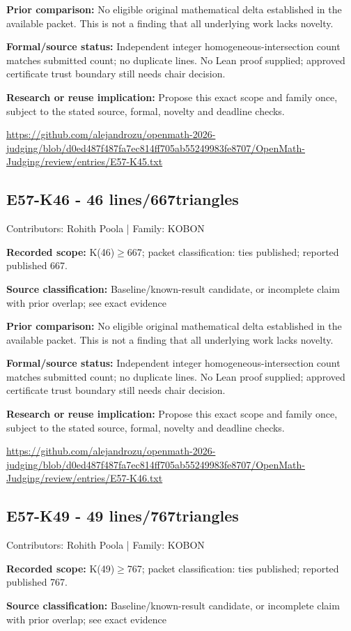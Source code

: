 \documentclass[11pt,a4paper]{article}
\begin{document}
\textbf{Prior comparison:} No eligible original mathematical delta established in the available packet. This is not a finding that all underlying work lacks novelty.

\textbf{Formal/source status:} Independent integer homogeneous-intersection count matches submitted count; no duplicate lines. No Lean proof supplied; approved certificate trust boundary still needs chair decision.

\textbf{Research or reuse implication:} Propose this exact scope and family once, subject to the stated source, formal, novelty and deadline checks.

{\small \url{https://github.com/alejandrozu/openmath-2026-judging/blob/d0ed487f487fa7ec814ff705ab55249983fe8707/OpenMath-Judging/review/entries/E57-K45.txt}\par}

\begin{samepage}
\subsection{E57-K46  -  46 lines/667triangles}
{\small Contributors: Rohith Poola | Family: KOBON\par}

\textbf{Recorded scope:} K(46)\ensuremath{\geq}667; packet classification: ties published; reported published 667.

\end{samepage}
\textbf{Source classification:} Baseline/known-result candidate, or incomplete claim with prior overlap; see exact evidence

\textbf{Prior comparison:} No eligible original mathematical delta established in the available packet. This is not a finding that all underlying work lacks novelty.

\textbf{Formal/source status:} Independent integer homogeneous-intersection count matches submitted count; no duplicate lines. No Lean proof supplied; approved certificate trust boundary still needs chair decision.

\textbf{Research or reuse implication:} Propose this exact scope and family once, subject to the stated source, formal, novelty and deadline checks.

{\small \url{https://github.com/alejandrozu/openmath-2026-judging/blob/d0ed487f487fa7ec814ff705ab55249983fe8707/OpenMath-Judging/review/entries/E57-K46.txt}\par}

\begin{samepage}
\subsection{E57-K49  -  49 lines/767triangles}
{\small Contributors: Rohith Poola | Family: KOBON\par}

\textbf{Recorded scope:} K(49)\ensuremath{\geq}767; packet classification: ties published; reported published 767.

\end{samepage}
\textbf{Source classification:} Baseline/known-result candidate, or incomplete claim with prior overlap; see exact evidence
\end{document}
